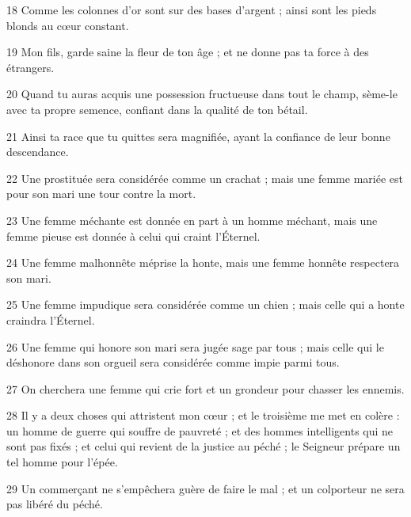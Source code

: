 \par 18 Comme les colonnes d'or sont sur des bases d'argent ; ainsi sont les pieds blonds au cœur constant.
\par 19 Mon fils, garde saine la fleur de ton âge ; et ne donne pas ta force à des étrangers.
\par 20 Quand tu auras acquis une possession fructueuse dans tout le champ, sème-le avec ta propre semence, confiant dans la qualité de ton bétail.
\par 21 Ainsi ta race que tu quittes sera magnifiée, ayant la confiance de leur bonne descendance.
\par 22 Une prostituée sera considérée comme un crachat ; mais une femme mariée est pour son mari une tour contre la mort.
\par 23 Une femme méchante est donnée en part à un homme méchant, mais une femme pieuse est donnée à celui qui craint l'Éternel.
\par 24 Une femme malhonnête méprise la honte, mais une femme honnête respectera son mari.
\par 25 Une femme impudique sera considérée comme un chien ; mais celle qui a honte craindra l'Éternel.
\par 26 Une femme qui honore son mari sera jugée sage par tous ; mais celle qui le déshonore dans son orgueil sera considérée comme impie parmi tous.
\par 27 On cherchera une femme qui crie fort et un grondeur pour chasser les ennemis.
\par 28 Il y a deux choses qui attristent mon cœur ; et le troisième me met en colère : un homme de guerre qui souffre de pauvreté ; et des hommes intelligents qui ne sont pas fixés ; et celui qui revient de la justice au péché ; le Seigneur prépare un tel homme pour l'épée.
\par 29 Un commerçant ne s'empêchera guère de faire le mal ; et un colporteur ne sera pas libéré du péché.



